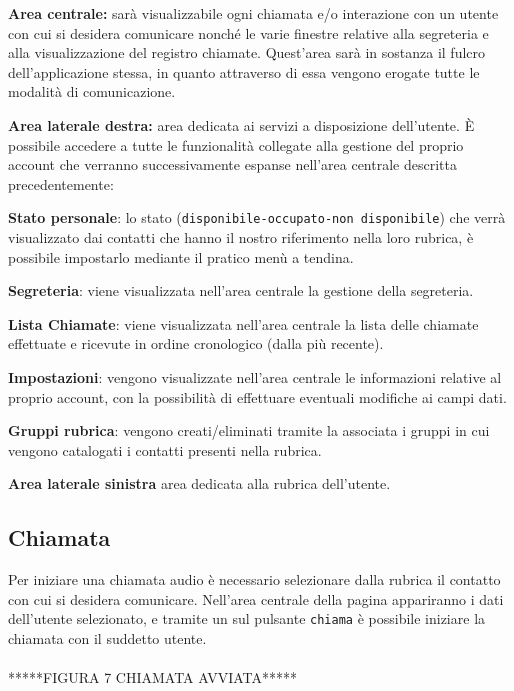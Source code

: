 \begin{description}
\item \textbf{Area centrale:} sarà visualizzabile ogni chiamata e/o interazione con un utente con cui si desidera comunicare nonché le varie finestre relative alla segreteria e alla visualizzazione del registro chiamate. Quest'area sarà in sostanza il fulcro dell'applicazione stessa, in quanto attraverso di essa vengono erogate tutte le modalità di comunicazione.

\item \textbf{Area laterale destra:} area dedicata ai servizi a disposizione dell'utente. È possibile accedere a tutte le funzionalità collegate alla gestione del proprio account che verranno successivamente espanse nell'area centrale descritta precedentemente:
\begin{description}
\item \textbf{Stato personale}: lo stato (\texttt{disponibile-occupato-non disponibile}) che verrà visualizzato dai contatti che hanno il nostro riferimento nella loro rubrica, è possibile impostarlo mediante il pratico menù a tendina.
\item \textbf{Segreteria}: viene visualizzata nell'area centrale la gestione della segreteria.
\item \textbf{Lista Chiamate}: viene visualizzata nell'area centrale la lista delle chiamate effettuate e ricevute in ordine cronologico (dalla più recente).
\item \textbf{Impostazioni}: vengono visualizzate nell'area centrale le informazioni relative al proprio account, con la possibilità di effettuare eventuali modifiche ai campi dati.
\item \textbf{Gruppi rubrica}: vengono creati/eliminati tramite la  associata i gruppi in cui vengono catalogati i contatti presenti nella rubrica.
\end{description}
\item \textbf{Area laterale sinistra} area dedicata alla rubrica dell'utente.  
\end{description}

\subsection{Chiamata}
Per iniziare una chiamata audio è necessario selezionare dalla rubrica il contatto con cui si desidera comunicare. Nell'area centrale della pagina appariranno i dati dell'utente selezionato, e tramite un  sul pulsante \texttt{chiama} è possibile iniziare la chiamata con il suddetto utente.
\\\\*****FIGURA 7 CHIAMATA AVVIATA*****
